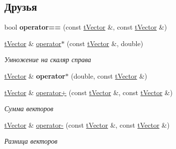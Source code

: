 \subsection*{Друзья}
\begin{DoxyCompactItemize}
\item 
\mbox{\label{classtVector_ac2deba186e1ddd047a218201d4cf1c6f}} 
bool {\bfseries operator==} (const \hyperlink{classtVector}{t\+Vector} \&, const \hyperlink{classtVector}{t\+Vector} \&)
\item 
\mbox{\label{classtVector_ade0381c9b2e5496022391703599e1cfe}} 
\hyperlink{classtVector}{t\+Vector} \& \hyperlink{classtVector_ade0381c9b2e5496022391703599e1cfe}{operator$\ast$} (const \hyperlink{classtVector}{t\+Vector} \&, double)
\begin{DoxyCompactList}\small\item\em Умножение на скаляр справа \end{DoxyCompactList}\item 
\mbox{\label{classtVector_a64a031b3695b984a50c362f8127f5bea}} 
\hyperlink{classtVector}{t\+Vector} \& {\bfseries operator$\ast$} (double, const \hyperlink{classtVector}{t\+Vector} \&)
\item 
\mbox{\label{classtVector_a9915bc8041ae050a433e85aea90f5471}} 
\hyperlink{classtVector}{t\+Vector} \& \hyperlink{classtVector_a9915bc8041ae050a433e85aea90f5471}{operator+} (const \hyperlink{classtVector}{t\+Vector} \&, const \hyperlink{classtVector}{t\+Vector} \&)
\begin{DoxyCompactList}\small\item\em Сумма векторов \end{DoxyCompactList}\item 
\mbox{\label{classtVector_ab805cb8e1108272d31808bf4d258ba15}} 
\hyperlink{classtVector}{t\+Vector} \& \hyperlink{classtVector_ab805cb8e1108272d31808bf4d258ba15}{operator-\/} (const \hyperlink{classtVector}{t\+Vector} \&, const \hyperlink{classtVector}{t\+Vector} \&)
\begin{DoxyCompactList}\small\item\em Разница векторов \end{DoxyCompactList}\item 
\mbox{\label{classtVector_abec310e2c4d30878d11d0b2f5d02cad4}} 

\end{DoxyCompactItemize}
